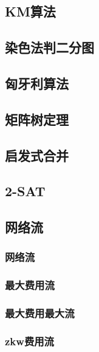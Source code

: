 \documentclass[10pt,a4paper]{article}
\begin{document}
\subsection{KM算法}

\subsection{染色法判二分图}

\subsection{匈牙利算法}

\subsection{矩阵树定理}
\begin{spacing}{1.5}

\end{spacing}
\subsection{启发式合并}

\subsection{2-SAT}

\subsection{网络流}
\subsubsection{网络流}
\begin{spacing}{1.5}

\end{spacing}
\subsubsection{最大费用流}

\subsubsection{最大费用最大流}

\subsubsection{zkw费用流}

\end{document}

